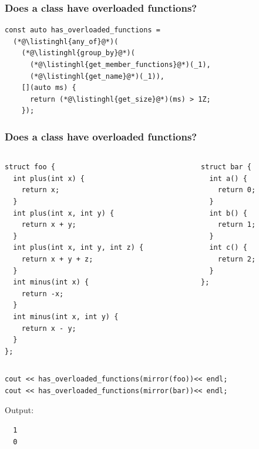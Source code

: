 \documentclass[compress,table,xcolor=table]{beamer}
\begin{document}
\begin{frame}[fragile]
  \frametitle{Does a class have overloaded functions?}
  \begin{lstlisting}[language=c++2x,basicstyle=\normalsize\ttfamily]
const auto has_overloaded_functions =
  (*@\listinghl{any_of}@*)(
    (*@\listinghl{group_by}@*)(
      (*@\listinghl{get_member_functions}@*)(_1),
      (*@\listinghl{get_name}@*)(_1)),
    [](auto ms) {
      return (*@\listinghl{get_size}@*)(ms) > 1Z;
    });
  \end{lstlisting}
\end{frame}
\begin{frame}[fragile]
  \frametitle{Does a class have overloaded functions?}
  \begin{columns}
    \begin{column}{.50\textwidth}
      \begin{lstlisting}[language=c++2x,basicstyle=\tiny\ttfamily]
struct foo {
  int plus(int x) {
    return x;
  }
  int plus(int x, int y) {
    return x + y;
  }
  int plus(int x, int y, int z) {
    return x + y + z;
  }
  int minus(int x) {
    return -x;
  }
  int minus(int x, int y) {
    return x - y;
  }
};
      \end{lstlisting}
    \end{column}
    \begin{column}{.40\textwidth}
      \begin{lstlisting}[language=c++2x,basicstyle=\scriptsize\ttfamily]
struct bar {
  int a() {
    return 0;
  }
  int b() {
    return 1;
  }
  int c() {
    return 2;
  }
};
      \end{lstlisting}
    \end{column}
  \end{columns}
  \begin{lstlisting}[language=c++2x,basicstyle=\footnotesize\ttfamily]
cout << has_overloaded_functions(mirror(foo))<< endl;
cout << has_overloaded_functions(mirror(bar))<< endl;
  \end{lstlisting}
  Output:
  \begin{verbatim}
  1
  0
  \end{verbatim}
\end{frame}
\end{document}

